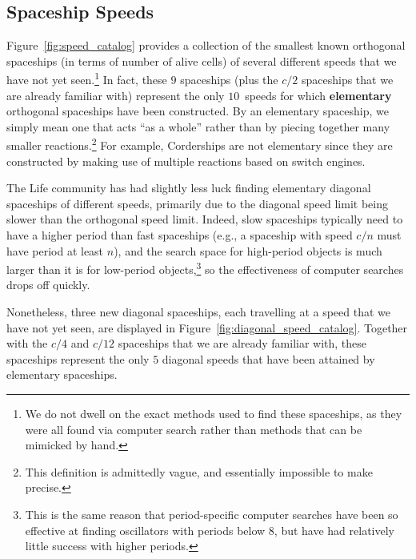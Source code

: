 \subsection{Spaceship Speeds}\label{sec:speed_catalog}

Figure~\ref{fig:speed_catalog} provides a collection of the smallest known orthogonal spaceships (in terms of number of alive cells) of several different speeds that we have not yet seen.\footnote{We do not dwell on the exact methods used to find these spaceships, as they were all found via computer search rather than methods that can be mimicked by hand.} In fact, these $9$ spaceships (plus the $c/2$ spaceships that we are already familiar with) represent the only $10$~speeds for which \textbf{elementary} orthogonal spaceships have been constructed. By an elementary spaceship, we simply mean one that acts ``as a whole'' rather than by piecing together many smaller reactions.\footnote{This definition is admittedly vague, and essentially impossible to make precise.} For example, Corderships are not elementary since they are constructed by making use of multiple reactions based on switch engines.

The Life community has had slightly less luck finding elementary diagonal spaceships of different speeds, primarily due to the diagonal speed limit being slower than the orthogonal speed limit. Indeed, slow spaceships typically need to have a higher period than fast spaceships (e.g., a spaceship with speed $c/n$ must have period at least $n$), and the search space for high-period objects is much larger than it is for low-period objects,\footnote{This is the same reason that period-specific computer searches have been so effective at finding oscillators with periods below $8$, but have had relatively little success with higher periods.} so the effectiveness of computer searches drops off quickly.

Nonetheless, three new diagonal spaceships, each travelling at a speed that we have not yet seen, are displayed in Figure~\ref{fig:diagonal_speed_catalog}. Together with the $c/4$ and $c/12$ spaceships that we are already familiar with, these spaceships represent the only $5$ diagonal speeds that have been attained by elementary spaceships.

